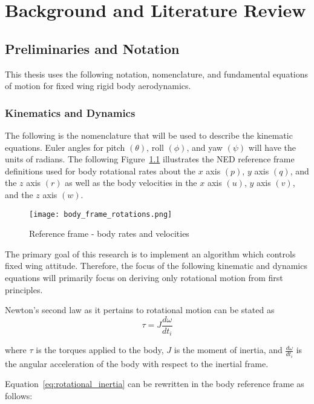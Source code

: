\chapter{Background and Literature Review}\label{ch:problem}
\section{Preliminaries and Notation}\label{preliminaries}
This thesis uses the following notation, nomenclature, and fundamental equations of motion for fixed wing rigid body aerodynamics.

\subsection{Kinematics and Dynamics}
The following is the nomenclature that will be used to describe the kinematic equations.  Euler angles for pitch $(\theta)$, roll $(\phi)$, and yaw $(\psi)$ will have the units of radians.  The following Figure~\ref{fig:reference_frame} illustrates the \ac{NED} reference frame definitions used for body rotational rates about the $x$ axis $(p)$, $y$ axis $(q)$, and the $z$ axis $(r)$ as well as the body velocities in the $x$ axis $(u)$, $y$ axis $(v)$, and the $z$ axis $(w)$.

\begin{figure}[h!]
 \centering
  \texttt{[image: body\_frame\_rotations.png]}
  \caption{Reference frame - body rates and velocities}
  \label{fig:reference_frame}
\end{figure}

The primary goal of this research is to implement an algorithm which controls fixed wing attitude.  Therefore, the focus of the following kinematic and dynamics equations will primarily focus on deriving only rotational motion from first principles.  

Newton's second law as it pertains to rotational motion can be stated as
\begin{equation}\label{eq:rotational_inertia}
\tau=J\frac{d\omega}{dt_i}
\end{equation}

where $\tau$ is the torques applied to the body, $J$ is the moment of inertia, and $ \frac{d\omega}{dt_i}$ is the angular acceleration of the body with respect to the inertial frame.

Equation~\ref{eq:rotational_inertia} can be rewritten in the body reference frame as follows:

